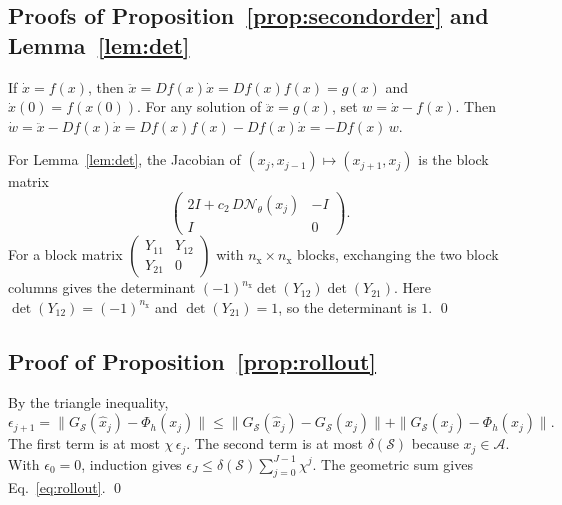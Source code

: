 \documentclass[11pt]{article}
\theoremstyle{definition}
\theoremstyle{remark}
\newcommand{\Aset}{\mathcal{A}}          %
\newcommand{\Net}{\mathcal{N}_\theta}    %
\newcommand{\Meth}{\mathcal{S}}          %
\begin{document}
\subsection{Proofs of Proposition~\ref{prop:secondorder} and Lemma~\ref{lem:det}}\label{app:secondorder}
If $\dot x = f(x)$, then $\ddot x = Df(x)\dot x = Df(x) f(x) = g(x)$ and $\dot x(0) = f(x(0))$.
For any solution of $\ddot x = g(x)$, set $w = \dot x - f(x)$.
Then $\dot w = \ddot x - Df(x)\dot x = Df(x)f(x) - Df(x)\dot x = -Df(x)\,w$.

For Lemma~\ref{lem:det}, the Jacobian of $(x_j, x_{j-1}) \mapsto (x_{j+1}, x_j)$ is the block matrix
\begin{equation*}
\begin{pmatrix} 2I + c_2\, D\Net(x_j) & -I \\ I & 0 \end{pmatrix}.
\end{equation*}
For a block matrix $\begin{pmatrix} Y_{11} & Y_{12} \\ Y_{21} & 0\end{pmatrix}$ with $n_{\mathrm{x}} \times n_{\mathrm{x}}$ blocks, exchanging the two block columns gives the determinant $(-1)^{n_{\mathrm{x}}}\det(Y_{12})\det(Y_{21})$.
Here $\det(Y_{12}) = (-1)^{n_{\mathrm{x}}}$ and $\det(Y_{21}) = 1$, so the determinant is $1$. \qed

\subsection{Proof of Proposition~\ref{prop:rollout}}\label{app:rollout}
By the triangle inequality,
\begin{equation*}
\epsilon_{j+1} = \|G_\Meth(\hat x_j) - \Phi_h(x_j)\| \le \|G_\Meth(\hat x_j) - G_\Meth(x_j)\| + \|G_\Meth(x_j) - \Phi_h(x_j)\|.
\end{equation*}
The first term is at most $\chi\,\epsilon_j$.
The second term is at most $\delta(\Meth)$ because $x_j \in \Aset$.
With $\epsilon_0 = 0$, induction gives $\epsilon_J \le \delta(\Meth)\sum_{j=0}^{J-1} \chi^j$.
The geometric sum gives Eq.~\eqref{eq:rollout}. \qed
\end{document}
